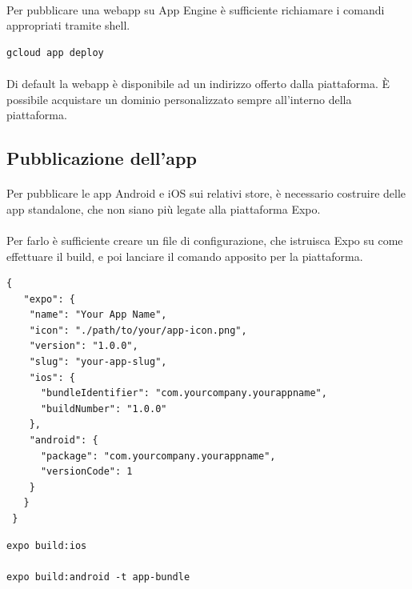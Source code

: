 \documentclass[11pt,a4paper,english]{article}
\begin{document}
\paragraph{} Per pubblicare una webapp su App Engine è sufficiente richiamare i comandi appropriati tramite shell. 

\begin{lstlisting}[caption=Pubblicazione della webapp su App Engine]
gcloud app deploy
\end{lstlisting}

\paragraph{} Di default la webapp è disponibile ad un indirizzo offerto dalla piattaforma. È possibile acquistare un dominio personalizzato sempre all'interno della piattaforma.

\subsection{Pubblicazione dell'app}

\paragraph{} Per pubblicare le app Android e iOS sui relativi store, è necessario costruire delle app standalone, che non siano più legate alla piattaforma Expo. 

\paragraph{} Per farlo è sufficiente creare un file di configurazione, che istruisca Expo su come effettuare il build, e poi lanciare il comando apposito per la piattaforma. 

\begin{lstlisting}[title=Struttura del file di configurazione]
{
   "expo": {
    "name": "Your App Name",
    "icon": "./path/to/your/app-icon.png",
    "version": "1.0.0",
    "slug": "your-app-slug",
    "ios": {
      "bundleIdentifier": "com.yourcompany.yourappname",
      "buildNumber": "1.0.0"
    },
    "android": {
      "package": "com.yourcompany.yourappname",
      "versionCode": 1
    }
   }
 }
\end{lstlisting}

\begin{lstlisting}[title=Comandi per effettuare il build delle due app]
expo build:ios     

expo build:android -t app-bundle
\end{lstlisting}
\end{document}
